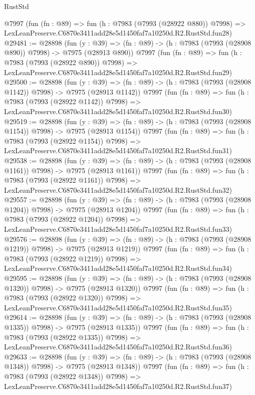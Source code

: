 \begin{lexlean}{RustStd}
\begin{coremodule}
    @7997
    (fun (fn : @89) =>
    fun (h : @7983 (@7993 (@28922 @880)) @7998) =>
    LexLeanPreserve.C6870e3411add28e5d1450faf7a10250d.R2.RustStd.fun28)
@29481 := @28898
    (fun (y : @39) => (fn : @89) -> (h : @7983 (@7993 (@28908 @890)) @7998) -> @7975 (@28913 @890))
    @7997
    (fun (fn : @89) =>
    fun (h : @7983 (@7993 (@28922 @890)) @7998) =>
    LexLeanPreserve.C6870e3411add28e5d1450faf7a10250d.R2.RustStd.fun29)
@29500 := @28898
    (fun (y : @39) =>
    (fn : @89) -> (h : @7983 (@7993 (@28908 @1142)) @7998) -> @7975 (@28913 @1142))
    @7997
    (fun (fn : @89) =>
    fun (h : @7983 (@7993 (@28922 @1142)) @7998) =>
    LexLeanPreserve.C6870e3411add28e5d1450faf7a10250d.R2.RustStd.fun30)
@29519 := @28898
    (fun (y : @39) =>
    (fn : @89) -> (h : @7983 (@7993 (@28908 @1154)) @7998) -> @7975 (@28913 @1154))
    @7997
    (fun (fn : @89) =>
    fun (h : @7983 (@7993 (@28922 @1154)) @7998) =>
    LexLeanPreserve.C6870e3411add28e5d1450faf7a10250d.R2.RustStd.fun31)
@29538 := @28898
    (fun (y : @39) =>
    (fn : @89) -> (h : @7983 (@7993 (@28908 @1161)) @7998) -> @7975 (@28913 @1161))
    @7997
    (fun (fn : @89) =>
    fun (h : @7983 (@7993 (@28922 @1161)) @7998) =>
    LexLeanPreserve.C6870e3411add28e5d1450faf7a10250d.R2.RustStd.fun32)
@29557 := @28898
    (fun (y : @39) =>
    (fn : @89) -> (h : @7983 (@7993 (@28908 @1204)) @7998) -> @7975 (@28913 @1204))
    @7997
    (fun (fn : @89) =>
    fun (h : @7983 (@7993 (@28922 @1204)) @7998) =>
    LexLeanPreserve.C6870e3411add28e5d1450faf7a10250d.R2.RustStd.fun33)
@29576 := @28898
    (fun (y : @39) =>
    (fn : @89) -> (h : @7983 (@7993 (@28908 @1219)) @7998) -> @7975 (@28913 @1219))
    @7997
    (fun (fn : @89) =>
    fun (h : @7983 (@7993 (@28922 @1219)) @7998) =>
    LexLeanPreserve.C6870e3411add28e5d1450faf7a10250d.R2.RustStd.fun34)
@29595 := @28898
    (fun (y : @39) =>
    (fn : @89) -> (h : @7983 (@7993 (@28908 @1320)) @7998) -> @7975 (@28913 @1320))
    @7997
    (fun (fn : @89) =>
    fun (h : @7983 (@7993 (@28922 @1320)) @7998) =>
    LexLeanPreserve.C6870e3411add28e5d1450faf7a10250d.R2.RustStd.fun35)
@29614 := @28898
    (fun (y : @39) =>
    (fn : @89) -> (h : @7983 (@7993 (@28908 @1335)) @7998) -> @7975 (@28913 @1335))
    @7997
    (fun (fn : @89) =>
    fun (h : @7983 (@7993 (@28922 @1335)) @7998) =>
    LexLeanPreserve.C6870e3411add28e5d1450faf7a10250d.R2.RustStd.fun36)
@29633 := @28898
    (fun (y : @39) =>
    (fn : @89) -> (h : @7983 (@7993 (@28908 @1348)) @7998) -> @7975 (@28913 @1348))
    @7997
    (fun (fn : @89) =>
    fun (h : @7983 (@7993 (@28922 @1348)) @7998) =>
    LexLeanPreserve.C6870e3411add28e5d1450faf7a10250d.R2.RustStd.fun37)

\end{coremodule}
\end{lexlean}

